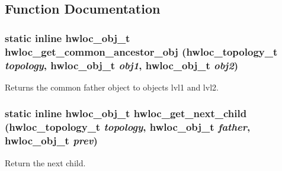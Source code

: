 \subsection{Function Documentation}
\hypertarget{group__hwlocality__helper__traversal__basic_g58ba3d31ed79e7a1a47909824489d317}{
\subsubsection[{hwloc\_\-get\_\-common\_\-ancestor\_\-obj}]{\setlength{\rightskip}{0pt plus 5cm}static inline {\bf hwloc\_\-obj\_\-t} hwloc\_\-get\_\-common\_\-ancestor\_\-obj ({\bf hwloc\_\-topology\_\-t} {\em topology}, \/  {\bf hwloc\_\-obj\_\-t} {\em obj1}, \/  {\bf hwloc\_\-obj\_\-t} {\em obj2})}}
\label{group__hwlocality__helper__traversal__basic_g58ba3d31ed79e7a1a47909824489d317}


Returns the common father object to objects lvl1 and lvl2. 

\hypertarget{group__hwlocality__helper__traversal__basic_g3727d1e62843468ad3796fae52881512}{
\subsubsection[{hwloc\_\-get\_\-next\_\-child}]{\setlength{\rightskip}{0pt plus 5cm}static inline {\bf hwloc\_\-obj\_\-t} hwloc\_\-get\_\-next\_\-child ({\bf hwloc\_\-topology\_\-t} {\em topology}, \/  {\bf hwloc\_\-obj\_\-t} {\em father}, \/  {\bf hwloc\_\-obj\_\-t} {\em prev})}}
\label{group__hwlocality__helper__traversal__basic_g3727d1e62843468ad3796fae52881512}


Return the next child. 

